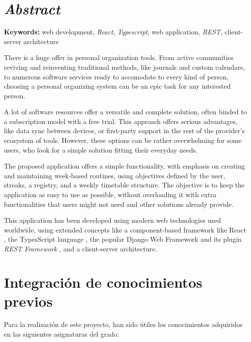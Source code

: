 \documentclass[10pt, a4paper]{aqademic}
\begin{document}
\newpage


\section{\textit{Abstract}}

\textbf{Keywords:} web development, \textit{React}, \textit{Typescript}, web application, \textit{REST}, client-server architecture

\bigskip

There is a huge offer in personal organization tools. From active communities reviving and reinventing traditional methods, like journals and custom calendars, 
to numerous software services ready to accomodate to every kind of person, choosing a personal organizing system can be an epic task for any interested person.

\medskip

A lot of software resources offer a versatile and complete solution, often binded to a subscription model with a free trial. This approach offers serious advantages, like data sync between devices, or first-party support in the rest of the provider's ecosystem of tools. However, these options can be rather overwhelming for some users, who look for a simple solution fitting their everyday needs.

\medskip

The proposed application offers a simple functionality, with emphasis on creating and maintaining week-based routines, using objectives defined by the user, streaks, a registry, and a weekly timetable structure. The objective is to keep the application as easy to use as possible, without overloading it with extra functionalities that users might not need and other solutions already provide. 

\medskip

This application has been developed using modern web technologies used worldwide, using extended concepts like a component-based framework like React \cite{react},
the TypesScript language \cite{bierman2014understanding}, the popular Django Web Framework \cite{django} and its plugin \textit{REST Framework} \cite{drf}, and a client-server architecture.


\newpage

\section{Integración de conocimientos previos}

Para la realización de este proyecto, han sido útiles los conocimientos adquiridos en las siguientes asignaturas del grado:
\end{document}
